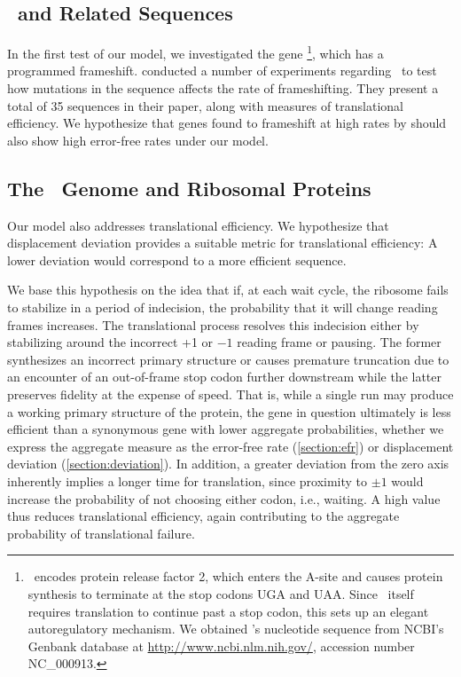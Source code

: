 \documentclass[12pt]{article}
\begin{document}
\subsection{\prfB\ and Related Sequences}
In the first test of our model, we investigated the gene
\prfB\footnote{
  \prfB\ encodes protein release factor 2, which enters
  the A-site and causes protein synthesis to terminate at the stop
  codons \textsc{UGA} and \textsc{UAA}. Since \prfB\ itself requires 
  translation to continue past a stop codon, this sets up an elegant 
  autoregulatory mechanism. We obtained \prfB's nucleotide sequence from
  NCBI's Genbank database at \url{http://www.ncbi.nlm.nih.gov/}, accession
  number NC\_000913.
}, which has a programmed frameshift.
\citet{weiss87} conducted a number of experiments regarding
\prfB\ to test how mutations in the sequence affects the rate of
frameshifting.  They present a total of 35 sequences in their paper,
along with measures of translational efficiency.  We hypothesize that
genes found to frameshift at high rates by
\citeauthor{weiss87} should also show high error-free rates under
our model.

\subsection{The \ecoli\ Genome and Ribosomal Proteins}
Our model also addresses
translational efficiency. We hypothesize that displacement deviation
provides a suitable metric for translational efficiency: A lower
deviation would correspond to a more efficient sequence.

We base this hypothesis on the idea that if, at each wait cycle, the
ribosome fails to stabilize in a period of indecision, the probability
that it will change reading frames increases. The translational
process resolves this indecision either by stabilizing around the
incorrect +1 or $-1$ reading frame or pausing. The former synthesizes an
incorrect primary structure or causes premature truncation due to an encounter of an
out-of-frame stop codon further downstream while the latter preserves fidelity at the
expense of speed. That is, while a single run may produce
a working primary structure of the protein, the gene in question
ultimately is less efficient than a synonymous gene with lower
aggregate probabilities, whether we express the aggregate measure as the
error-free rate (\autoref{section:efr}) or displacement deviation
(\autoref{section:deviation}). In addition, a greater deviation from
the zero axis inherently implies a longer time for translation, 
since proximity to $\pm1$ would increase the probability of not choosing
either codon, i.e., waiting. A high value thus reduces translational
efficiency, again contributing to the aggregate probability of
translational failure.
\end{document}
